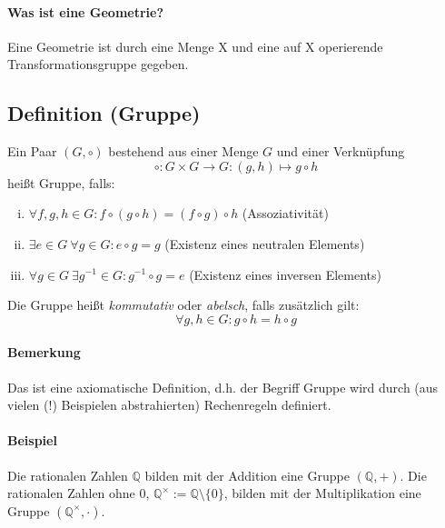 \paragraph{Was ist eine Geometrie?}
	Eine Geometrie ist durch eine Menge X und eine auf X operierende Transformationsgruppe gegeben.

\subsection{Definition (Gruppe)}
	\begin{Definition}[Gruppe]
		Ein Paar $(G,\circ)$ bestehend aus einer Menge $G$ und einer Verknüpfung 
		\[\circ : G\times G \to G : (g,h) \mapsto g \circ h\]
		heißt Gruppe, falls:
                \begin{enumerate}[(i)]
                        \item $\forall f,g,h \in G : f\circ (g\circ h) = (f\circ g)\circ h$ \hfill (Assoziativität)
                        \item $\exists e\in G\ \forall g\in G : e\circ g = g$ \hfill (Existenz eines neutralen Elements)
                        \item $\forall g \in G\ \exists g^{-1} \in G : g^{-1}\circ g = e$ \hfill (Existenz eines inversen Elements)
                \end{enumerate}
                Die Gruppe heißt \emph{kommutativ} oder \emph{abelsch}, falls zusätzlich gilt:
                        \[\forall g,h\in G: g\circ h = h\circ g\] %
	\end{Definition}

\paragraph{Bemerkung}
	Das ist eine axiomatische Definition, d.h. der Begriff \glqq Gruppe\grqq{} wird durch (aus vielen (!) Beispielen abstrahierten) \glqq Rechenregeln\grqq{} definiert.
\paragraph{Beispiel}
	Die rationalen Zahlen $\mathbb{Q}$ bilden mit der Addition eine Gruppe $(\mathbb{Q} ,+)$.
	Die rationalen Zahlen ohne $0$, $\mathbb{Q}^{\times} := \mathbb{Q}\setminus \{0\}$, bilden mit der Multiplikation eine Gruppe $(\mathbb{Q}^\times ,\cdot)$.


